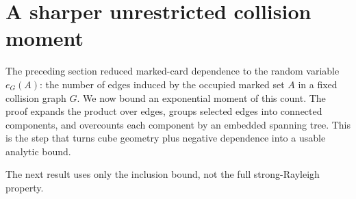 \documentclass[11pt]{article}
\numberwithin{equation}{section}
\theoremstyle{definition}\newtheorem{definition}[theorem]{Definition}
\theoremstyle{remark}\newtheorem{remark}[theorem]{Remark}
\begin{document}
\section{A sharper unrestricted collision moment}
\label{sec:moment}
The preceding section reduced marked-card dependence to the random variable
$e_G(A)$: the number of edges induced by the occupied marked set $A$ in a fixed
collision graph $G$.  We now bound an exponential moment of this count.  The
proof expands the product over edges, groups selected edges into connected
components, and overcounts each component by an embedded spanning tree.  This
is the step that turns cube geometry plus negative dependence into a usable
analytic bound.

The next result uses only the inclusion bound, not the full
strong-Rayleigh property.
\end{document}
